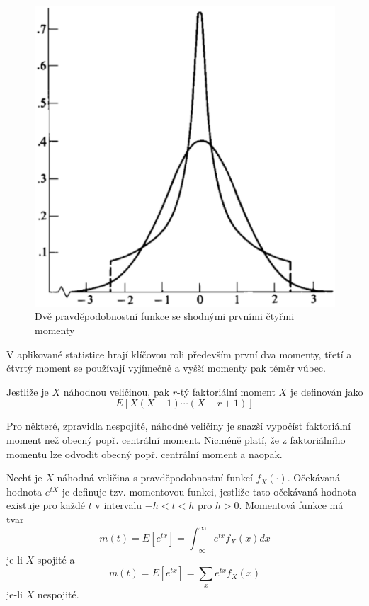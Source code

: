 \begin{figure}[htp]
\centering
\includegraphics[scale = 0.3]{pictures/first_four_moments.eps}
\caption{Dvě pravděpodobnostní funkce se shodnými prvními čtyřmi momenty}
\label{first_four_moments}
\end{figure}

V aplikované statistice hrají klíčovou roli především první dva momenty, třetí a čtvrtý moment se používají vyjímečně a vyšší momenty pak téměr vůbec.

\begin{definition}
Jestliže je $X$ náhodnou veličinou, pak $r$-tý faktoriální moment $X$ je definován jako
\begin{equation*}
E[X(X-1) \cdots (X - r + 1)]
\end{equation*}
\end{definition}
Pro některé, zpravidla nespojité, náhodné veličiny je snazší vypočíst faktoriální moment než obecný popř. centrální moment. Nicméně platí, že z faktoriálního momentu lze odvodit obecný popř. centrální moment a naopak.

\begin{definition}
Nechť je $X$ náhodná veličina s pravděpodobnostní funkcí $f_X(\cdot)$. Očekávaná hodnota $e^{tX}$ je definuje tzv. momentovou funkci, jestliže tato očekávaná hodnota existuje pro každé $t$ v intervalu $-h < t < h$ pro $h > 0$. Momentová funkce má tvar
\begin{equation*}
m(t) = E[e^{tx}] = \int_{-\infty}^{\infty} e^{tx}f_X(x)dx
\end{equation*}
je-li $X$ spojité a
\begin{equation*}
m(t) = E[e^{tx}] = \sum_x e^{tx}f_X(x)
\end{equation*}
je-li $X$ nespojité.
\end{definition}

